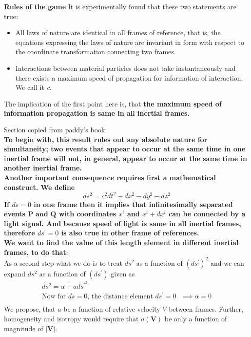 \documentclass[11pt]{report}
\newcommand{\mbf}[1]{\mathbf{#1}}
\newcommand{\tbf}[1]{\textbf{#1}}
\newcommand{\tit}[1]{\textit{#1}}
\begin{document}
\textbf{Rules of the game}
It is experimentally found that these two statements are true:
\begin{itemize}
\item All laws of nature are identical in all frames of reference, that is, the equations expressing the laws of nature are invariant in form with respect to the coordinate transformation connecting two frames.
\item Interactions between material particles does not take instantaneously and there exists a maximum speed of propagation for information of interaction. We call it \tit{c}.
\end{itemize}

The implication of the first point here is, that \tbf{the maximum speed of information propagation is same in all inertial frames.}



Section copied from paddy's book:\\
\textbf{To begin with, this result rules out any absolute nature for simultaneity; two events that appear to occur at the same time in one inertial frame will not, in general, appear to occur at the same time in another inertial frame.}\\
\textbf{Another important consequence requires first a mathematical construct. We define
\begin{equation}
ds^2=c^2dt^2 - dx^2 - dy^2 - dz^2
\end{equation}
If $ds=0$ in one frame then it implies that infinitesimally separated events $\mbf{P\text{ and } Q}$ with coordinates $x^i$ and $x^i+dx^i$ can be connected by a light signal. And because speed of light is same in all inertial frames, therefore $ds^\prime=0$ is also true in other frame of references. }
\\
\textbf{We want to find the value of this length element in different inertial frames, to do that}:\\
As a second step what we do is to treat $ds^2$ as a function of $(ds^\prime)^2$ and we can expand $ds^2$ as a function of $(ds^\prime)$ given as
\begin{eqnarray*}
ds^2=\alpha + a ds^{\prime^2}\\
\text{Now for $ds=0$, the distance element  $ds^\prime=0$ } \implies \alpha=0\\
\end{eqnarray*}  
We propose, that $a$ be a function of relative velocity $V$ between frames. Further, homogeneity and isotropy would require that $a(\mbf{V})$ be only a function of magnitude of $|\mbf{V}|$.
\end{document}
